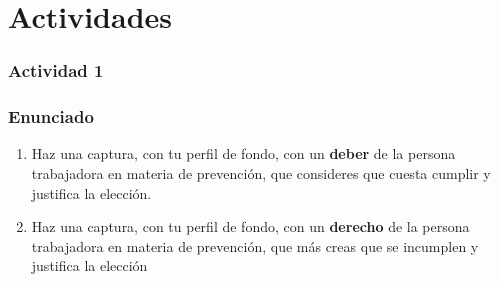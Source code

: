 \section{Actividades}

\subsubsection{Actividad 1}

\subsubsection{Enunciado}
\begin{enumerate}[label=\alph*.]
    \item Haz una captura, con tu perfil de fondo, con un \textbf{deber} de la persona trabajadora en materia de prevención, que consideres que cuesta cumplir y justifica la elección.
    \item Haz una captura, con tu perfil de fondo, con un \textbf{derecho} de la persona trabajadora en materia de prevención, que más creas que se incumplen y justifica la elección
\end{enumerate}

